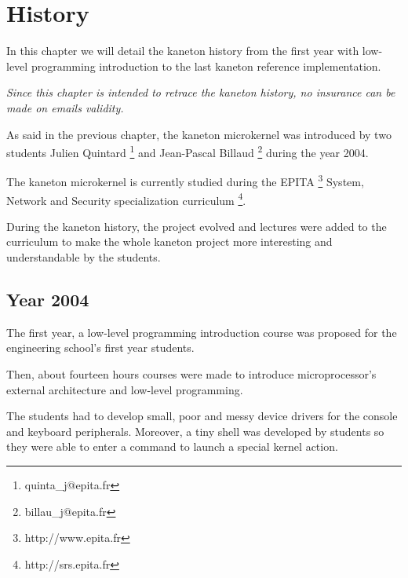 
%
%

\chapter{History}

In this chapter we will detail the kaneton history from the first
year with low-level programming introduction to the last kaneton
reference implementation.

\newpage

%
%

\textit{Since this chapter is intended to retrace the kaneton history,
  no insurance can be made on emails validity.}

As said in the previous chapter, the kaneton microkernel was introduced
by two students
Julien Quintard
  \footnote{quinta\_j@epita.fr} and
Jean-Pascal Billaud
  \footnote{billau\_j@epita.fr}
during the year 2004.

The kaneton microkernel is currently studied during the
EPITA
  \footnote{http://www.epita.fr}
System, Network and Security specialization curriculum
  \footnote{http://srs.epita.fr}.

During the kaneton history, the project evolved and lectures were added
to the curriculum to make the whole kaneton project more interesting and
understandable by the students.

%
%

\section{Year 2004}

The first year, a low-level programming introduction course was proposed
for the engineering school's first year students.

Then, about fourteen hours courses were made to introduce microprocessor's
external architecture and low-level programming.

The students had to develop small, poor and messy device drivers for the
console and keyboard peripherals. Moreover, a tiny shell was developed
by students so they were able to enter a command to launch a special
kernel action.

